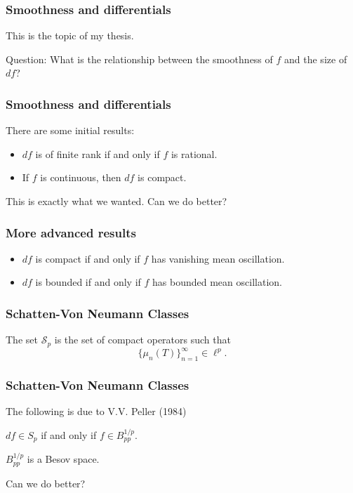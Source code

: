 \documentclass{beamer}
\begin{document}
\begin{frame}
\frametitle{Smoothness and differentials}
This is the topic of my thesis.
\begin{block}
    {Question:}
    What is the relationship between the smoothness of $f$
    and the size of $df$?    
\end{block}
\end{frame}

\begin{frame}
\frametitle{Smoothness and differentials}
There are some initial results:
\begin{itemize}
    \item{} $df$ is of finite rank if and only if $f$ is rational.
    \item{} If $f$ is continuous, then $df$ is compact.
\end{itemize}
This is exactly what we wanted. Can we do better?
\end{frame}

\begin{frame}
\frametitle{More advanced results}
\begin{itemize}
    \item{} $df$ is compact if and only if $f$ has vanishing mean oscillation.
    \item{} $df$ is bounded if and only if $f$ has bounded mean oscillation.
\end{itemize}
\end{frame}

\begin{frame}
\frametitle{Schatten-Von Neumann Classes}
\begin{definition}
    The set $\mathcal{S}_p$ is the set of compact operators such that
    \begin{equation*}
        \{\mu_n(T)\}_{n=1}^\infty \in \ell^p.
    \end{equation*}
\end{definition}
\end{frame}

\begin{frame}
\frametitle{Schatten-Von Neumann Classes}
The following is due to V.V. Peller (1984)
\begin{theorem}
    $df \in S_p$ if and only if $f \in B_{pp}^{1/p}$.
\end{theorem}
$B_{pp}^{1/p}$ is a Besov space.
\end{frame}

\begin{frame}
    Can we do better?
\end{frame}
\end{document}
